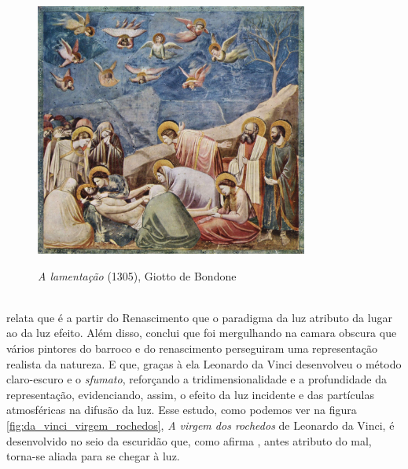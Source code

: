 \begin{figure}[H]
    \centering
    \caption{\textit{A lamentação} (1305), Giotto de Bondone}
	\vspace*{0,2cm}
    \includegraphics[width=0.8\textwidth]{./04-figuras/giotto_lamentacao}
    \label{fig:giotto_lamentacao}
\end{figure}
\vspace*{-0,9cm}
{\raggedright {}}\\

 relata que é a partir do Renascimento que o paradigma da luz atributo da lugar ao da luz efeito. Além disso, conclui que foi mergulhando na camara obscura que vários pintores do barroco e do renascimento perseguiram uma representação realista da natureza. E que, graças à ela Leonardo da Vinci desenvolveu o método claro-escuro e o \textit{sfumato}, reforçando a tridimensionalidade e a profundidade da representação, evidenciando, assim, o efeito da luz incidente e das partículas atmosféricas na difusão da luz. Esse estudo,  como podemos ver na figura \ref{fig:da_vinci_virgem_rochedos}, \textit{A virgem dos rochedos} de Leonardo da Vinci, é desenvolvido no seio da escuridão que, como afirma , antes atributo do mal, torna-se aliada para se chegar à luz.

